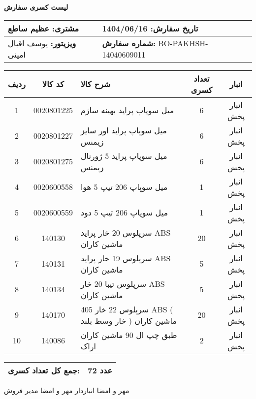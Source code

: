 \documentclass[a4paper,12pt]{article}
\begin{document}
\begin{center}
    {\Huge \textbf{   لیست کسری سفارش   }} \\
\end{center}

\vspace{0.5cm}

\noindent
\begin{tabular}{|p{7cm}|p{7cm}|}
\hline
\textbf{مشتری:} عظیم ساطع & \textbf{تاریخ سفارش:} 1404/06/16 \\
\hline
\textbf{ویزیتور:} یوسف اقبال امینی & \textbf{شماره سفارش:} BO-PAKHSH-14040609011 \\
\hline
\end{tabular}

\vspace{0.5cm}

\begin{longtable}{|c|c|p{6cm}|c|c|}
\hline
\rowcolor{headerblue} \color{white}
\textbf{ردیف} &  \textbf{کد کالا} & \textbf{شرح کالا} & \textbf{تعداد کسری} & \textbf{انبار} \\
\hline
\endhead
1 & 0020801225 & میل سوپاپ پراید بهینه ساژم & 6 & انبار پخش \\
\hline
2 & 0020801227 & میل سوپاپ پراید اور سایز زیمنس & 6 & انبار پخش \\
\hline
3 & 0020801275 & میل سوپاپ پراید 5 ژورنال زیمنس & 6 & انبار پخش \\
\hline
4 & 0020600558 & میل سوپاپ 206 تیپ 5 هوا & 1 & انبار پخش \\
\hline
5 & 0020600559 & میل سوپاپ 206 تیپ 5 دود & 1 & انبار پخش \\
\hline
6 & 140130 & سرپلوس 20 خار پرايد ABS ماشين کاران & 20 & انبار پخش \\
\hline
7 & 140131 & سرپلوس 19 خار پرايد ABS ماشين کاران & 5 & انبار پخش \\
\hline
8 & 140134 & سرپلوس تيبا 20 خار ABS ماشين کاران & 5 & انبار پخش \\
\hline
9 & 140170 & سرپلوس 22 خار 405 ABS ( خار وسط بلند ) ماشين کاران & 20 & انبار پخش \\
\hline
10 & 140086 & طبق چپ ال 90 ماشين کاران اراک & 2 & انبار پخش \\
\hline

\end{longtable}

\vspace{0.3cm}
\noindent
\begin{tabular}{|p{7cm}|p{7cm}|}
\hline
\textbf{جمع کل تعداد کسری:} & 72 عدد \\
\hline
\end{tabular}

\vspace{1.5cm}

\noindent
مهر و امضا انباردار \hspace{8cm} مهر و امضا مدیر فروش
\end{document}
